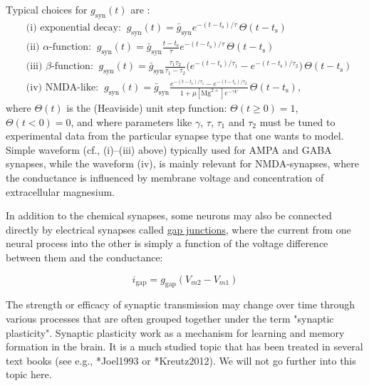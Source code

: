 Typical choices for $g_\text{syn}(t)$ are : 
\begin{align}
&\text{(i) exponential decay:} \;\; g_\text{syn}(t) = \bar{g}_\text{syn} e^{-(t-t_\text{s})/\tau}\, \Theta(t-t_\text{s}) \\
&\text{(ii) $\alpha$-function:} \;\; g_\text{syn}(t) = \bar{g}_\text{syn} \frac{t-t_\text{s}}{\tau} e^{-(t-t_\text{s})/\tau} \, \Theta(t-t_\text{s}) \\
&\text{(iii) $\beta$-function:} \;\; g_\text{syn}(t) = \bar{g}_\text{syn} \frac{\tau_1 \tau_2}{\tau_1-\tau_2} 
\Big( e^{-(t-t_\text{s})/\tau_1} - e^{-(t-t_\text{s})/\tau_2} \Big) \, \Theta(t-t_\text{s}) \\
& \text{(iv) NMDA-like:} \;\; g_\text{syn}(t) = \bar{g}_\text{syn} \frac{e^{-(t-t_\text{s})/\tau_1} - e^{-(t-t_\text{s})/\tau_2}} {1+\mu [\text{Mg}^{2+}] e^{-\gamma V} } \, \Theta(t-t_\text{s}),
\label{Neuron:eq:synapseforms}
\end{align}
where $\Theta(t)$ is the (Heaviside) unit step function: $\Theta(t \ge 0)=1$,  $\Theta(t< 0)=0$, and where parameters like $\gamma$,  $\tau$, $\tau_1$ and $\tau_2$ must be tuned to experimental data from the particular synapse type that one wants to model. Simple waveform (cf., (i)--(iii) above) typically used for AMPA  and GABA synapses, while the waveform (iv), is mainly relevant for NMDA-synapses, where the conductance is influenced by membrane voltage and concentration of extracellular magnesium. 

In addition to the chemical synapses, some neurons may also be connected directly by electrical synapses called \underline{gap junctions}, where the current from one neural process into the other is simply a function of the voltage difference between them and the conductance: 

\begin{equation}
i_\text{gap}=g_\text{gap} (V_{m2}-V_{m1})
\label{Neuron:eq:gapjunction}
\end{equation}

The strength or efficacy of synaptic transmission may change over time through various processes that are often grouped together under the term "synaptic plasticity". Synaptic plasticity work as a mechanism for learning and memory formation in the brain. It is a much studied topic that has been treated in several text books (see e.g., \citeasnoun**{Joel1993} or \citeasnoun**{Kreutz2012}). We will not go further into this topic here.



